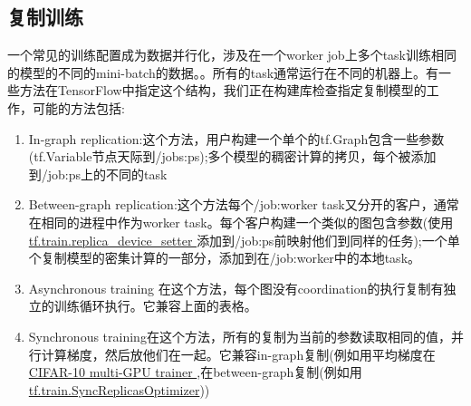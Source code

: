 \subsection{复制训练}
一个常见的训练配置成为数据并行化，涉及在一个worker job上多个task训练相同的模型的不同的mini-batch的数据。。所有的task通常运行在不同的机器上。有一些方法在TensorFlow中指定这个结构，我们正在构建库检查指定复制模型的工作，可能的方法包括:
\begin{enumerate}
\item In-graph replication:这个方法，用户构建一个单个的tf.Graph包含一些参数(tf.Variable节点天际到/jobs:ps);多个模型的稠密计算的拷贝，每个被添加到/job:ps上的不同的task
\item Between-graph replication:这个方法每个/job:worker task又分开的客户，通常在相同的进程中作为worker task。每个客户构建一个类似的图包含参数(使用\href{https://www.tensorflow.org/api_docs/python/tf/train/replica_device_setter}{ tf.train.replica\_device\_setter }添加到/job:ps前映射他们到同样的任务);一个单个复制模型的密集计算的一部分，添加到在/job:worker中的本地task。
\item Asynchronous training 在这个方法，每个图没有coordination的执行复制有独立的训练循环执行。它兼容上面的表格。
\item Synchronous training在这个方法，所有的复制为当前的参数读取相同的值，并行计算梯度，然后放他们在一起。它兼容in-graph复制(例如用平均梯度在\href{https://github.com/tensorflow/models/tree/master/tutorials/image/cifar10/cifar10_multi_gpu_train.py}{ CIFAR-10 multi-GPU trainer },在between-graph复制(例如用\href{https://www.tensorflow.org/api_docs/python/tf/train/SyncReplicasOptimizer}{tf.train.SyncReplicasOptimizer}))
\end{enumerate}
